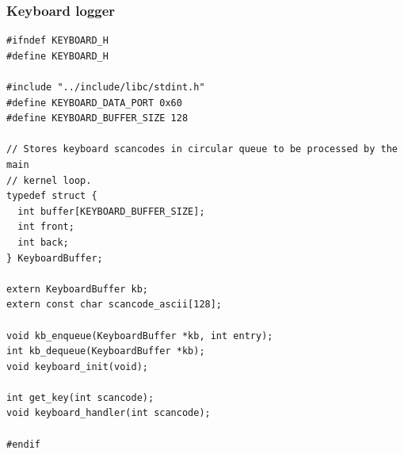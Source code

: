 \documentclass[../main.tex]{subfiles}
\begin{document}


\subsubsection{Keyboard logger}
\label{apx:keyboard_logger}


\begin{listing}[H]
    \begin{verbatim}
#ifndef KEYBOARD_H
#define KEYBOARD_H

#include "../include/libc/stdint.h"
#define KEYBOARD_DATA_PORT 0x60
#define KEYBOARD_BUFFER_SIZE 128

// Stores keyboard scancodes in circular queue to be processed by the main
// kernel loop.
typedef struct {
  int buffer[KEYBOARD_BUFFER_SIZE];
  int front;
  int back;
} KeyboardBuffer;

extern KeyboardBuffer kb;
extern const char scancode_ascii[128];

void kb_enqueue(KeyboardBuffer *kb, int entry);
int kb_dequeue(KeyboardBuffer *kb);
void keyboard_init(void);

int get_key(int scancode);
void keyboard_handler(int scancode);

#endif
    \end{verbatim}
    \caption{Implementation of \texttt{keyboard.h}}
    \label{lst:keyboard_h}
\end{listing}
\end{document}
